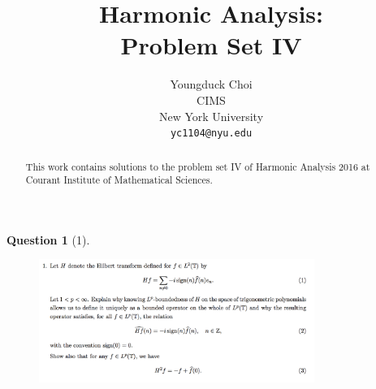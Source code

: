 \documentclass{article} %
\title{Harmonic Analysis:  \\
Problem Set IV}
\author{
Youngduck Choi \\
CIMS \\
New York University\\
\texttt{yc1104@nyu.edu} \\
}
\theoremstyle{quest}
\newtheorem*{question}{Question}
\begin{document}
\maketitle

\begin{abstract}
This work contains solutions to the problem set IV
of Harmonic Analysis 2016 at Courant Institute of Mathematical Sciences.
\end{abstract}

\bigskip

\begin{question}[1]
\hfill
\begin{figure}[h!]
  \centering
    \includegraphics[width=0.8\textwidth]{HA-4-1.png}
\end{figure}
\end{question}
\end{document}
